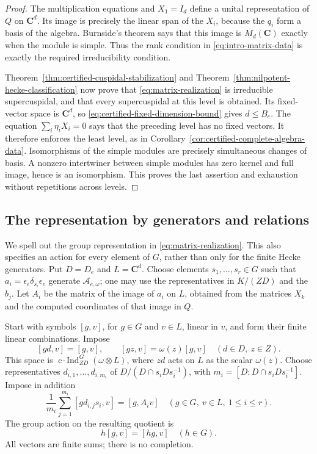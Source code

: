 \documentclass[10pt,letterpaper]{amsart}
\numberwithin{equation}{section}
\theoremstyle{remark}
\newcommand{\cInd}{\operatorname{c\!-\!Ind}}
\newcommand{\C}{\mathbf C}
\begin{document}
\begin{proof}
The multiplication equations and $X_1=I_d$ define a unital representation
of $Q$ on $\C^d$. Its image is precisely the linear span of the $X_i$,
because the $q_i$ form a basis of the algebra. Burnside's theorem says that
this image is $M_d(\C)$ exactly when the module is simple. Thus the rank
condition in \eqref{eq:intro-matrix-data} is exactly the required
irreducibility condition.

Theorem~\ref{thm:certified-cuspidal-stabilization} and
Theorem~\ref{thm:nilpotent-hecke-classification} now prove that
\eqref{eq:matrix-realization} is irreducible supercuspidal, and that every
supercuspidal at this level is obtained. Its fixed-vector space is $\C^d$,
so \eqref{eq:certified-fixed-dimension-bound} gives $d\le B_e$.
The equation $\sum_i\eta_iX_i=0$ says that the preceding level has no fixed
vectors. It therefore enforces the least level, as in
Corollary~\ref{cor:certified-complete-algebra-data}. Isomorphisms of the
simple modules are precisely simultaneous changes of basis. A nonzero
intertwiner between simple modules has zero kernel and full image, hence
is an isomorphism. This proves the last assertion and exhaustion without
repetitions across levels.
\end{proof}

\subsection{The representation by generators and relations}

We spell out the group representation in \eqref{eq:matrix-realization}.
This also specifies an action for every element of $G$, rather than only
for the finite Hecke generators. Put $D=D_e$ and $L=\C^d$. Choose elements
$s_1,\ldots,s_r\in G$ such that
$a_i=\epsilon_e\delta_{s_i}\epsilon_e$ generate $\mathcal A_{e,\omega}$;
one may use the representatives in $K/(ZD)$ and the $b_j$. Let $A_i$ be
the matrix of the image of $a_i$ on $L$, obtained from the matrices $X_k$
and the computed coordinates of that image in $Q$.

Start with symbols $[g,v]$, for $g\in G$ and $v\in L$, linear in $v$,
and form their finite linear combinations. Impose
\begin{equation}\label{eq:symbol-central}
 [gd,v]=[g,v],\qquad [gz,v]=\omega(z)[g,v]
 \quad(d\in D,\ z\in Z).
\end{equation}
This space is $\cInd_{ZD}^G(\omega\otimes L)$, where
$zd$ acts on $L$ as the scalar $\omega(z)$. Choose representatives
$d_{i,1},\ldots,d_{i,m_i}$ of
$D/(D\cap s_iDs_i^{-1})$, with
$m_i=[D:D\cap s_iDs_i^{-1}]$. Impose in addition
\begin{equation}\label{eq:symbol-hecke}
 \frac1{m_i}\sum_{j=1}^{m_i}[g d_{i,j}s_i,v]=[g,A_i v]
 \quad(g\in G,\ v\in L,\ 1\le i\le r).
\end{equation}
The group action on the resulting quotient is
\begin{equation}\label{eq:symbol-action}
 h[g,v]=[hg,v]\quad(h\in G).
\end{equation}
All vectors are finite sums; there is no completion.
\end{document}
